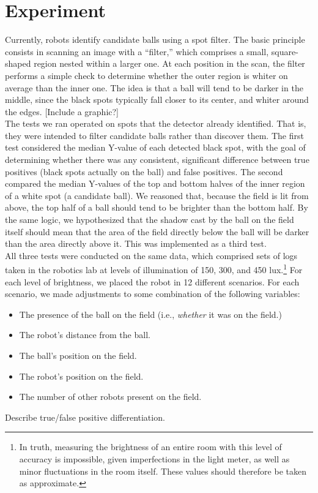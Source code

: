 \documentclass[11pt, twocolumn]{article}
\begin{document}
\section{Experiment}
Currently, robots identify candidate balls using a spot filter. The basic principle consists in scanning an image with a ``filter,'' which comprises a small, square-shaped region nested within a larger one. At each position in the scan, the filter performs a simple check to determine whether the outer region is whiter on average than the inner one. The idea is that a ball will tend to be darker in the middle, since the black spots typically fall closer to its center, and whiter around the edges. [Include a graphic?] \\
The tests we ran operated on spots that the detector already identified. That is, they were intended to filter candidate balls rather than discover them. The first test considered the median Y-value of each detected black spot, with the goal of determining whether there was any consistent, significant difference between true positives (black spots actually on the ball) and false positives. The second compared the median Y-values of the top and bottom halves of the inner region of a white spot (a candidate ball). We reasoned that, because the field is lit from above, the top half of a ball should tend to be brighter than the bottom half. By the same logic, we hypothesized that the shadow cast by the ball on the field itself should mean that the area of the field directly below the ball will be darker than the area directly above it. This was implemented as a third test. \\
\indent All three tests were conducted on the same data, which comprised sets of logs taken in the robotics lab at levels of illumination of 150, 300, and 450 lux.\footnote{In truth, measuring the brightness of an entire room with this level of accuracy is impossible, given imperfections in the light meter, as well as minor fluctuations in the room itself. These values should therefore be taken as approximate.} For each level of brightness, we placed the robot in 12 different scenarios. For each scenario, we made adjustments to some combination of the following variables:
\begin{itemize}
\item The presence of the ball on the field (i.e., \emph{whether} it was on the field.)
\item The robot's distance from the ball.
\item The ball's position on the field.
\item The robot's position on the field.
\item The number of other robots present on the field.
\end{itemize}
Describe true/false positive differentiation.
\end{document}
